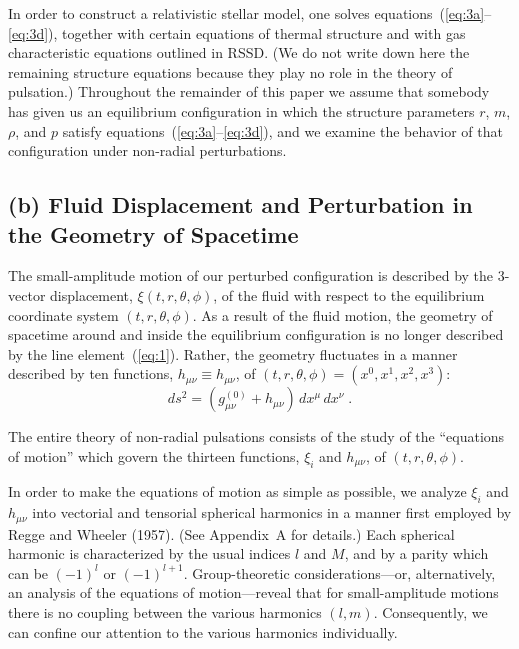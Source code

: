 \documentclass[12pt]{article}
\begin{document}
In order to construct a relativistic stellar model, one solves equations~(\ref{eq:3a}--\ref{eq:3d}),
together with certain equations of thermal structure and with gas characteristic equations
outlined in RSSD. (We do not write down here the remaining structure equations because
they play no role in the theory of pulsation.) Throughout the remainder of this
paper we assume that somebody has given us an equilibrium configuration in which
the structure parameters $r$, $m$, $\rho$, and $p$ satisfy equations~(\ref{eq:3a}--\ref{eq:3d}), and we examine the behavior of that configuration under non-radial perturbations.

\subsection*{(b) Fluid Displacement and Perturbation in the Geometry of Spacetime}

The small-amplitude motion of our perturbed configuration is described by the 3-vector
displacement, $\xi(t, r, \theta, \phi)$, of the fluid with respect to the equilibrium coordinate system $(t, r, \theta, \phi)$.
As a result of the fluid motion, the geometry of spacetime around and inside the equilibrium configuration is no longer described by the line element~(\ref{eq:1}). Rather, the
geometry fluctuates in a manner described by ten functions, $h_{\mu\nu} \equiv h_{\mu\nu}$, of $(t, r, \theta, \phi) = (x^0, x^1, x^2, x^3)$:
\begin{equation}
  ds^2 = (g_{\mu\nu}^{(0)} + h_{\mu\nu})\,dx^\mu\,dx^\nu \;.
\label{eq:5}
\end{equation}

The entire theory of non-radial pulsations consists of the study of the ``equations of
motion'' which govern the thirteen functions, $\xi_i$ and $h_{\mu\nu}$, of $(t, r, \theta, \phi)$.

In order to make the equations of motion as simple as possible, we analyze $\xi_i$ and
$h_{\mu\nu}$ into vectorial and tensorial spherical harmonics in a manner first employed by Regge
and Wheeler (1957). (See Appendix~A for details.) Each spherical harmonic is characterized
by the usual indices $l$ and $M$, and by a parity which can be $(-1)^l$ or
$(-1)^{l+1}$. Group-theoretic considerations---or, alternatively, an analysis of the equations
of motion---reveal that for small-amplitude motions there is no coupling between the
various harmonics $(l, m)$. Consequently, we can confine our attention to the various harmonics individually.
\end{document}
